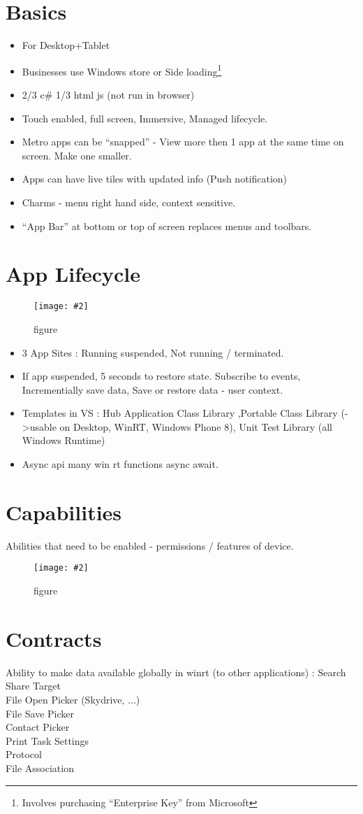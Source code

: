 \documentclass[a4paper,10pt]{scrreprt}
\newcommand{\pic}[2][figure]{\begin{figure}[h]
 \centering
 \texttt{[image: \#2]}
 \caption{#1}
\end{figure}
}
\begin{document}
\section{Basics}
\begin{itemize}
 \item For Desktop+Tablet
 \item Businesses use Windows store or Side loading\footnote{Involves purchasing ``Enterprise Key'' from Microsoft}
 \item 2/3 c\# 1/3 html js (not run in browser)
 \item Touch enabled, full screen, Immersive, Managed lifecycle. 
 \item Metro apps can be ``snapped'' - View more then 1 app at the same time on screen. Make one smaller.
 \item Apps can have live tiles with updated info (Push notification)
 \item Charms - menu right hand side, context sensitive. 
 \item ``App Bar'' at bottom or top of screen replaces menus and toolbars.
\end{itemize}

\section{App Lifecycle}
\pic{al.png}
\begin{itemize}
 \item 3 App Sites :
 \subitem Running suspended, Not running / terminated.
 \item If app suspended, 5 seconds to restore state. 
 \subitem Subscribe to events, Incrementially save data, Save or restore data - user context.
 \item Templates in VS : Hub Application Class Library ,Portable Class Library (->usable on Desktop, WinRT, Windows 
Phone 8), Unit Test Library (all Windows Runtime)
\item Async api  many win rt functions async await.
\end{itemize}

\section{Capabilities}
Abilities that need to be enabled - permissions / features of device.
\pic{abil.png}

\section{Contracts}
Ability to make data available globally in winrt (to other applications) :
Search\\
Share Target \\
File Open Picker (Skydrive, ...)\\
File Save Picker\\
Contact Picker\\
Print Task Settings\\
Protocol\\
File Association\\
\end{document}
